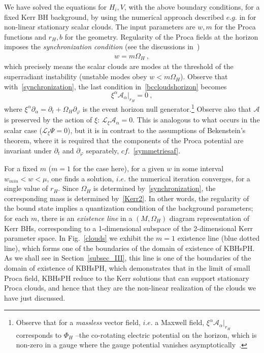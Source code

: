 \documentclass{article}
\numberwithin{equation}{section}
\begin{document}
 
We have solved the equations for $H_i,V$, with the above boundary  conditions, for
a fixed Kerr BH background, by using the numerical approach described $e.g.$ in \cite{Herdeiro:2014pka}
for non-linear stationary scalar clouds.
The input parameters are $w,m$ for the Proca functions and $r_H,b$ for the geometry.
Regularity of the Proca fields at the horizon imposes the \textit{synchronization condition} (see the discussions in~\cite{Benone:2014ssa,Brihaye:2014nba})
 \begin{eqnarray}
w=m\Omega_H~,
\label{synchronization} 
\end{eqnarray}
which precisely means the scalar clouds are modes at the threshold of the superradiant instability (unstable modes obey $w<m\Omega_H$).  Observe that with~\eqref{synchronization}, the last condition in~\eqref{bccloudshorizon} becomes
\begin{equation}
\label{condA}
\xi^\alpha \mathcal{A}_\alpha\big|_{r_H}=0 \ ,
\end{equation}
%
where $\xi^\alpha\partial_\alpha=\partial_t+\Omega_H\partial_\varphi$ is the event horizon null generator.\footnote{Observe that for a \textit{massless} vector field, $i.e.$ a Maxwell field, $\xi^\alpha \mathcal{A}_\alpha\big|_{r_H}$ corresponds 
to $\Phi_H$ --the co-rotating electric potential on the horizon, which is non-zero in a gauge where the gauge potential vanishes asymptotically~\cite{Townsend:1997ku}.}
Observe also that  $\mathcal{A}$ is preserved by the action of $\xi$: $\mathcal{L}_\xi\mathcal{A}_\alpha=0$. 
This is analogous to what occurs in the scalar case ($\mathcal{L}_\xi\Psi=0$), but it is in contrast to the assumptions of Bekenstein's theorem, where it is required that the components of the Proca potential are invariant under $\partial_t$ and $\partial_\varphi$ separately, $cf.$~\eqref{symmetriesaf}.


For a fixed $m$ ($m=1$ for the case here), for a given $w$ in some interval $w_{min}<w<\mu$, one finds a solution,  $i.e.$ the numerical iteration converges,  for a single value of $r_H$. Since $\Omega_H$ is determined by~\eqref{synchronization}, the corresponding mass is determined by~\eqref{Kerr2}. In other words, the regularity of the bound state implies a quantization condition of the background parameters; for each $m$, there is an \textit{existence line} in a $(M,\Omega_H)$ diagram representation of Kerr BHs, corresponding to a 1-dimensional subspace of the 2-dimensional Kerr parameter space. In Fig.~\ref{clouds} we exhibit the $m=1$ existence line (blue dotted line), which forms one of the boundaries of the domain of existence of KBHsPH. As we shall see in Section~\ref{subsec_III}, this line is one of the boundaries of the domain of existence of KBHsPH, which demonstrates that in the limit of small Proca field, KBHsPH reduce to the Kerr solutions that can support stationary Proca clouds, and hence that they are the non-linear realization of the clouds we have just discussed. 
\end{document}
